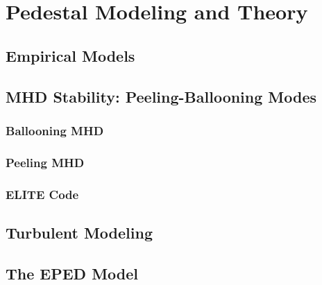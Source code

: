 \chapter{Pedestal Modeling and Theory}\label{ch:Modeling}


\section{Empirical Models}\label{sec:mod_empirical}

\nicesectionending

\section{MHD Stability: Peeling-Ballooning Modes}\label{sec:mod_pb}

\subsection{Ballooning MHD}\label{subsec:mod_balloon}

\subsection{Peeling MHD}\label{subsec:mod_peel}

\subsection{ELITE Code}\label{subsec:mod_elite}

\nicesectionending

\section{Turbulent Modeling}\label{subsec:mod_turbulence}

\nicesectionending

\section{The EPED Model}\label{subsec:mod_eped}

\nicechapterending


